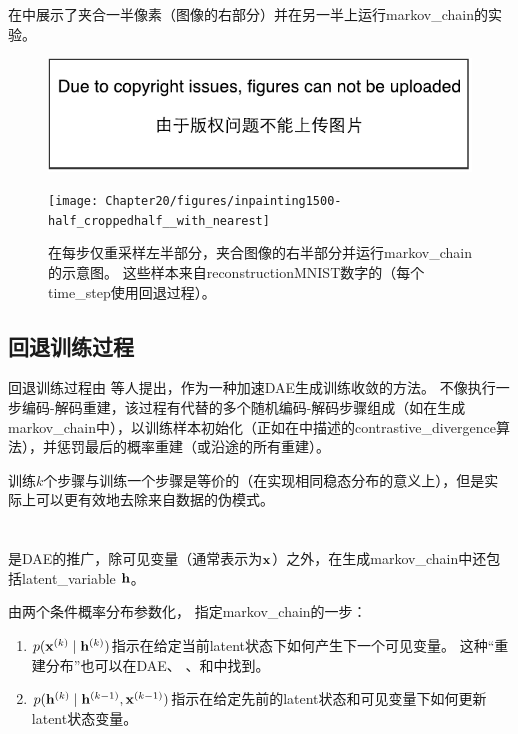 在中展示了夹合一半像素（图像的右部分）并在另一半上运行\gls{markov_chain}的实验。

\begin{figure}[!htb]
\ifOpenSource
\centerline{\includegraphics{figure.pdf}}
\else
\centerline{\texttt{[image: Chapter20/figures/inpainting1500-half\_croppedhalf\_\_with\_nearest]}}
\fi
\caption{在每步仅重采样左半部分，夹合图像的右半部分并运行\gls{markov_chain}的示意图。
这些样本来自\gls{reconstruction}MNIST数字的（每个\gls{time_step}使用回退过程）。
}
\label{fig:chap20_inpainting1500-half_croppedhalf__with_nearest}
\end{figure}

\subsection{回退训练过程}
\label{sec:walk_back_training_procedure}
回退训练过程由\citet{Bengio-et-al-NIPS2013-small} 等人提出，作为一种加速\gls{DAE}生成训练收敛的方法。
不像执行一步编码-解码重建，该过程有代替的多个随机编码-解码步骤组成（如在生成\gls{markov_chain}中），以训练样本初始化（正如在中描述的\gls{contrastive_divergence}算法），并惩罚最后的概率重建（或沿途的所有重建）。

训练$k$个步骤与训练一个步骤是等价的（在实现相同稳态分布的意义上），但是实际上可以更有效地去除来自数据的伪模式。


\section{}
\label{sec:generative_stochastic_networks}
 \citep{Bengio-et-al-ICML-2014} 是\gls{DAE}的推广，除可见变量（通常表示为$\mathbf{x}$）之外，在生成\gls{markov_chain}中还包括\gls{latent_variable} $\mathbf{h}$。

由两个条件概率分布参数化， 指定\gls{markov_chain}的一步：
\begin{enumerate}
 \item $p(\mathbf{x}^{(k)}  \mid \mathbf{h}^{(k)} )$指示在给定当前\gls{latent}状态下如何产生下一个可见变量。
 这种``重建分布''也可以在\gls{DAE}、 、和中找到。
 \item $p(\mathbf{h}^{(k)}  \mid \mathbf{h}^{(k-1)}, \mathbf{x}^{(k-1)})$指示在给定先前的\gls{latent}状态和可见变量下如何更新\gls{latent}状态变量。
\end{enumerate}

